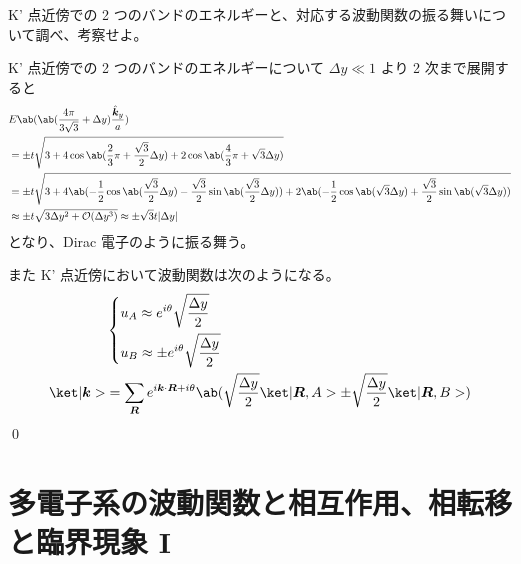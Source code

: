 \documentclass[uplatex,dvipdfmx,a4paper,11pt]{jlreq}
\makeatletter
\newcommand{\R}{\bm{R}}
\newcommand{\kk}{\bm{k}}
\numberwithin{equation}{section}
\theoremstyle{definition}
\renewenvironment{proof}[1][\proofname]{\par
  \normalfont
  \topsep6\p@\@plus6\p@ \trivlist
  \item[\hskip\labelsep{\bfseries #1}\@addpunct{\bfseries}]\ignorespaces\quad\par
}{%
  \qed\endtrivlist\@endpefalse
}
\renewcommand\proofname{証明}
\makeatother
\begin{document}
\begin{problem}
K' 点近傍での 2 つのバンドのエネルギーと、対応する波動関数の振る舞いについて調べ、考察せよ。
\end{problem}
\begin{proof}
  K' 点近傍での 2 つのバンドのエネルギーについて $\Delta y \ll 1$ より 2 次まで展開すると
  \begin{align}
     & E\ab(\ab(\frac{4\pi}{3\sqrt{3}} + \Delta y)\frac{\hat{\kk}_y}{a})                                                                                                                                                           \\
     & = \pm t\sqrt{3 + 4\cos\ab(\frac{2}{3}\pi + \frac{\sqrt{3}}{2}\Delta y) + 2\cos\ab(\frac{4}{3}\pi + \sqrt{3}\Delta y)}                                                                                                       \\
     & = \pm t\sqrt{3 + 4\ab(-\frac{1}{2}\cos\ab(\frac{\sqrt{3}}{2}\Delta y) - \frac{\sqrt{3}}{2}\sin\ab(\frac{\sqrt{3}}{2}\Delta y)) + 2\ab(-\frac{1}{2}\cos\ab(\sqrt{3}\Delta y) + \frac{\sqrt{3}}{2}\sin\ab(\sqrt{3}\Delta y))} \\
     & \approx \pm t\sqrt{3\Delta y^2 + \mathcal{O}(\Delta y^3)} \approx \pm \sqrt{3}t|\Delta y|
  \end{align}
  となり、Dirac 電子のように振る舞う。

  また K' 点近傍において波動関数は次のようになる。
  \begin{align}
              & \begin{dcases}
                  u_A \approx e^{i\theta}\sqrt{\frac{\Delta y}{2}} \\
                  u_B \approx \pm e^{i\theta}\sqrt{\frac{\Delta y}{2}}
                \end{dcases}                                                               \\
    \ket|\kk> & = \sum_{\R}e^{i\kk\cdot\R + i\theta}\ab(\sqrt{\frac{\Delta y}{2}}\ket|\R, A> \pm \sqrt{\frac{\Delta y}{2}}\ket|\R, B>)
  \end{align}
\end{proof}

\clearpage

\setcounter{section}{5}
\section{多電子系の波動関数と相互作用、相転移と臨界現象 I}
\setcounter{subsection}{3}
\end{document}
